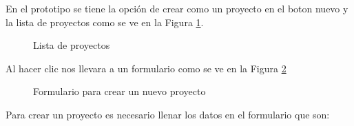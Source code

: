 En el prototipo se tiene la opci\'on de crear como un proyecto en el boton nuevo y la lista de proyectos como se ve en la Figura \ref{fig:homePototype}.
\begin{figure}[H]
\caption{Lista de proyectos} \label{fig:homePototype}
\centering
{}
\end{figure}

Al hacer clic nos llevara a un formulario como se ve en la Figura \ref{fig:formnewproject}
\begin{figure}[H]
\caption{Formulario para crear un nuevo proyecto} \label{fig:formnewproject}
\centering
{}
\end{figure}
Para crear un proyecto es necesario llenar los datos en el formulario que son:

